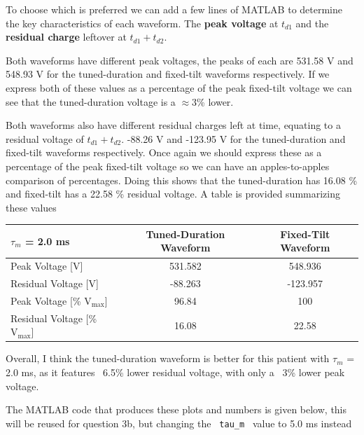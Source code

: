 \documentclass[]{report}
\begin{document}
To choose which is preferred we can add a few lines of MATLAB to determine the key characteristics of each waveform. The \textbf{peak voltage} at $t_{d1}$ and the \textbf{residual charge} leftover at $t_{d1} + t_{d2}$.

Both waveforms have different peak voltages, the peaks of each are 531.58 V and 548.93 V for the tuned-duration and fixed-tilt waveforms respectively. If we express both of these values as a percentage of the peak fixed-tilt voltage we can see that the tuned-duration voltage is a $\approx 3$\% lower. 

Both waveforms also have different residual charges left at time, equating to a residual voltage of $t_{d1} + t_{d2}$. -88.26 V and -123.95 V for the tuned-duration and fixed-tilt waveforms respectively. Once again we should express these as a percentage of the peak fixed-tilt voltage so we can have an apples-to-apples comparison of percentages. Doing this shows that the tuned-duration has 16.08 \% and fixed-tilt has a 22.58 \% residual voltage. A table is provided summarizing these values

\begin{table}[H]
	\centering
	\begin{tabular}{@{}lcc@{}}
		\toprule
		$\tau_m$ = 2.0 ms                     & Tuned-Duration Waveform & Fixed-Tilt Waveform \\ \midrule
		Peak Voltage {[}V{]}                  & 531.582               & 548.936             \\
		Residual Voltage {[}V{]}              & -88.263                 & -123.957           \\
		Peak Voltage {[}\% $\text{V}_\text{max}${]}  & 96.84                   & 100                 \\
		Residual Voltage {[}\% $\text{V}_\text{max}${]} & 16.08                   & 22.58              
	\end{tabular}
\end{table}

Overall, I think the tuned-duration waveform is better for this patient with $\tau_m$ = 2.0 ms, as it features ~6.5\% lower residual voltage, with only a ~3\% lower peak voltage.

The MATLAB code that produces these plots and numbers is given below, this will be reused for question 3b, but changing the \texttt{ tau\_m } value to 5.0 ms instead
\end{document}
